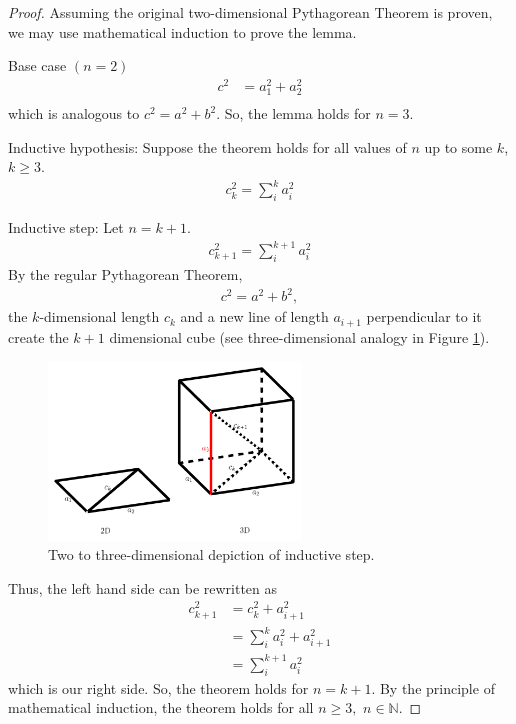 \begin{proof}

    Assuming the original two-dimensional Pythagorean Theorem is proven, we may use mathematical induction to prove the lemma.
    
    \noindent 
    Base case $\left(n=2\right)$
    \begin{equation*}
        \begin{split}
            c^2&=a_1^2+a_2^2\\
        \end{split}
    \end{equation*}
    which is analogous to $c^2=a^2+b^2$. So, the lemma holds for $n=3$.
    
    \noindent Inductive hypothesis: Suppose the theorem holds for all values of $n$ up to some $k$, $k \geq 3$.
    \begin{equation*}
        \begin{split}
            c_k^2=\sum_{i}^{k}a_i^2
        \end{split}
    \end{equation*}
    
    \noindent Inductive step: Let $n=k+1$. 
    \begin{equation*}
        \begin{split}
        c_{k+1}^2=\sum_{i}^{k+1}a^2_{i}
        \end{split}
    \end{equation*}
    By the regular Pythagorean Theorem,
    \begin{align*}
        c^2=a^2+b^2,
    \end{align*}
    the $k$-dimensional length $c_k$ and a new line of length $a_{i+1}$ perpendicular to it create the $k+1$ dimensional cube (see three-dimensional analogy in Figure \ref{fig:induction}).
    
    \begin{figure}[h]
        \centering
        \includegraphics[width=0.6\textwidth]{images/induction.png}
        \caption{Two to three-dimensional depiction of inductive step.}
        \label{fig:induction}
    \end{figure}
    \noindent
    Thus, the left hand side can be rewritten as
    \begin{align*}
        c_{k+1}^2&=c_k^2+a_{i+1}^2\\
        &=\sum_{i}^{k}a_i^2+a_{i+1}^2\\
        &=\sum_{i}^{k+1}a^2_{i}
    \end{align*}
    which is our right side. So, the theorem holds for $n=k+1$. 
    By the principle of mathematical induction, the theorem holds for all $n \geq 3,$ $n \in \mathbb{N}$.
\end{proof}
